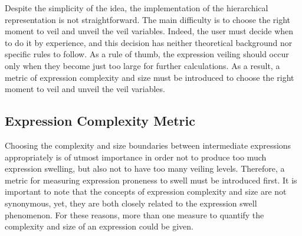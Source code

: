 Despite the simplicity of the idea, the implementation of the hierarchical representation is not straightforward. The main difficulty is to choose the right moment to veil and unveil the veil variables. Indeed, the user must decide when to do it by experience, and this decision has neither theoretical background nor specific rules to follow. As a rule of thumb, the expression veiling should occur only when they become just too large for further calculations. As a result, a metric of expression complexity and size must be introduced to choose the right moment to veil and unveil the veil variables.

\subsection{Expression Complexity Metric}

Choosing the complexity and size boundaries between intermediate expressions appropriately is of utmost importance in order not to produce too much expression swelling, but also not to have too many veiling levels. Therefore, a metric for measuring expression proneness to swell must be introduced first. It is important to note that the concepts of expression complexity and size are not synonymous, yet, they are both closely related to the expression swell phenomenon. For these reasons, more than one measure to quantify the complexity and size of an expression could be given.

